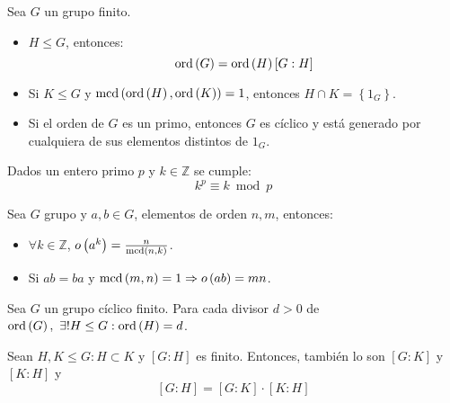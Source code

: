 \begin{coro}
Sea $G$ un grupo finito.
\begin{itemize}
\item $H \le G$, entonces:
\[
\operatorname{ord} \left( G \right) = \operatorname{ord}\left( H \right)\left[ G : H \right]
\]
\item Si $K \le G$ y $\operatorname{mcd}\left( \operatorname{ord}\left( H \right), \operatorname{ord}\left( K \right) \right) = 1$, entonces $H \cap K = \left\{ 1_G \right\}$.

\item Si el orden de $G$ es un primo, entonces $G$ es cíclico y está generado por cualquiera de sus elementos distintos de $1_G$.
\end{itemize}
\end{coro}

\begin{coro}
Dados un entero primo $p$ y $k \in \mathbb{Z}$ se cumple:
\[
k^p \equiv k \bmod p
\]
\end{coro}

\begin{lema}
Sea $G$ grupo y $a, b \in G$, elementos de orden $n, m$, entonces:
\begin{itemize}
    \item $\forall k \in \mathbb{Z}$, $o\left( a^k \right) = \frac{n}{\operatorname{mcd}\left( n,k \right)}$.
    \item Si $ab = ba$ y $\operatorname{mcd}\left( m, n \right) = 1 \Rightarrow o\left( a b \right) = mn$.
\end{itemize}
\end{lema}

\begin{prop}
Sea $G$ un grupo cíclico finito. Para cada divisor $d > 0$ de $\operatorname{ord}\left( G \right),\ \exists! H \le G : \operatorname{ord}\left( H \right) = d$.
\end{prop}

\begin{prop}
Sean $H, K \le G: H \subset K$ y $\left[ G : H \right]$ es finito. Entonces, también lo son $\left[ G: K \right]$ y $\left[ K : H \right]$ y 
\[
    \left[ G : H \right] = \left[ G : K \right] \cdot \left[ K : H \right]
\]
\end{prop}
